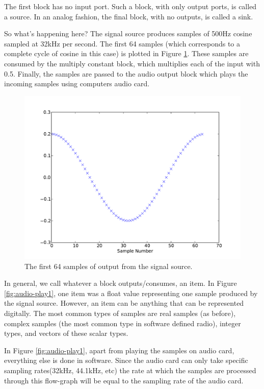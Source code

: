 \documentclass[a4paper,10pt]{article}
\begin{document}
The first block has no input port. Such a block, with only output ports, is called a source. 
In an analog fashion, the final block, with no outputs, is called a sink.

So what's happening here?
The signal source produces samples of 500Hz cosine sampled at 32kHz per second.
The first 64 samples (which corresponds to a complete cycle of cosine in this case)
is plotted in Figure \ref{fig:signal-source-out}.
These samples are consumed by the multiply constant block,
which multiplies each of the input with 0.5.
Finally, the samples are passed to the audio output block which plays the incoming samples using computers audio card.
\begin{figure}
 \centering
 \includegraphics[scale=0.4]{figures/signal-source-out}
 \caption{The first 64 samples of output from the signal source. \label{fig:signal-source-out}}
\end{figure}

In general, we call whatever a block outputs/consumes, an item. 
In Figure \ref{fig:audio-play1}, one item was a float value representing one sample produced by the signal source. 
However, an item can be anything that can be represented digitally. 
The most common types of samples are real samples (as before), complex samples (the most common type in software defined radio), integer types, and vectors of these scalar types.

In Figure \ref{fig:audio-play1}, apart from playing the samples on audio card, everything else is done in software.
Since the audio card can only take specific sampling rates(32kHz, 44.1kHz, etc)
the rate at which the samples are processed through this flow-graph will be equal to the sampling rate of the audio card.
\end{document}
